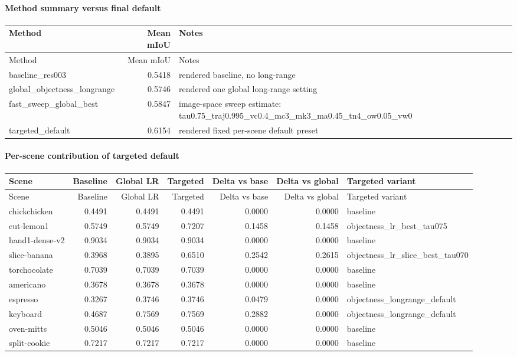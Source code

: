 \documentclass[10pt]{article}
\begin{document}
\paragraph{Method summary versus final default}
\small
\begin{longtable}{lrp{9cm}}
\toprule
Method & Mean mIoU & Notes \\
\midrule
\endfirsthead
\toprule
Method & Mean mIoU & Notes \\
\midrule
\endhead
baseline\_res003 & 0.5418 & rendered baseline, no long-range \\
global\_objectness\_longrange & 0.5746 & rendered one global long-range setting \\
fast\_sweep\_global\_best & 0.5847 & image-space sweep estimate: tau0.75\_traj0.995\_vc0.4\_mc3\_mk3\_ma0.45\_tn4\_ow0.05\_vw0 \\
targeted\_default & 0.6154 & rendered fixed per-scene default preset \\
\bottomrule
\end{longtable}
\normalsize

\paragraph{Per-scene contribution of targeted default}
\small
\begin{longtable}{lrrrrrl}
\toprule
Scene & Baseline & Global LR & Targeted & Delta vs base & Delta vs global & Targeted variant \\
\midrule
\endfirsthead
\toprule
Scene & Baseline & Global LR & Targeted & Delta vs base & Delta vs global & Targeted variant \\
\midrule
\endhead
chickchicken & 0.4491 & 0.4491 & 0.4491 & 0.0000 & 0.0000 & baseline \\
cut-lemon1 & 0.5749 & 0.5749 & 0.7207 & 0.1458 & 0.1458 & objectness\_lr\_best\_tau075 \\
hand1-dense-v2 & 0.9034 & 0.9034 & 0.9034 & 0.0000 & 0.0000 & baseline \\
slice-banana & 0.3968 & 0.3895 & 0.6510 & 0.2542 & 0.2615 & objectness\_lr\_slice\_best\_tau070 \\
torchocolate & 0.7039 & 0.7039 & 0.7039 & 0.0000 & 0.0000 & baseline \\
americano & 0.3678 & 0.3678 & 0.3678 & 0.0000 & 0.0000 & baseline \\
espresso & 0.3267 & 0.3746 & 0.3746 & 0.0479 & 0.0000 & objectness\_longrange\_default \\
keyboard & 0.4687 & 0.7569 & 0.7569 & 0.2882 & 0.0000 & objectness\_longrange\_default \\
oven-mitts & 0.5046 & 0.5046 & 0.5046 & 0.0000 & 0.0000 & baseline \\
split-cookie & 0.7217 & 0.7217 & 0.7217 & 0.0000 & 0.0000 & baseline \\
\bottomrule
\end{longtable}
\normalsize
\end{document}
